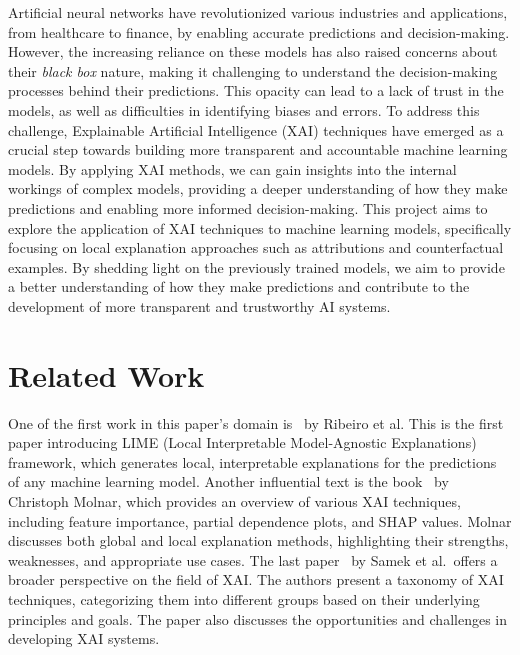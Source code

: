 \documentclass[conference]{IEEEtran}
\begin{document}
    Artificial neural networks have revolutionized various industries and applications, from healthcare to finance, by enabling accurate predictions and decision-making.
    However, the increasing reliance on these models has also raised concerns about their \textit{black box} nature, making it challenging to understand the decision-making processes behind their predictions.
    This opacity can lead to a lack of trust in the models, as well as difficulties in identifying biases and errors.
    To address this challenge, Explainable Artificial Intelligence (XAI) techniques have emerged as a crucial step towards building more transparent and accountable machine learning models.
    By applying XAI methods, we can gain insights into the internal workings of complex models, providing a deeper understanding of how they make predictions and enabling more informed decision-making.
    This project aims to explore the application of XAI techniques to machine learning models, specifically focusing on local explanation approaches such as attributions and counterfactual examples.
    By shedding light on the previously trained models, we aim to provide a better understanding of how they make predictions and contribute to the development of more transparent and trustworthy AI systems.

\section{Related Work}\label{sec:related-work}

    One of the first work in this paper's domain is~\cite{ribeiro2016should} by Ribeiro et al.
    This is the first paper introducing LIME (Local Interpretable Model-Agnostic Explanations) framework, which generates local, interpretable explanations for the predictions of any machine learning model.
    Another influential text is the book~\cite{molnar2019interpretable} by Christoph Molnar, which provides an overview of various XAI techniques, including feature importance, partial dependence plots, and SHAP values.
    Molnar discusses both global and local explanation methods, highlighting their strengths, weaknesses, and appropriate use cases.
    The last paper~\cite{samek2017explainable} by Samek et al.\ offers a broader perspective on the field of XAI\@.
    The authors present a taxonomy of XAI techniques, categorizing them into different groups based on their underlying principles and goals.
    The paper also discusses the opportunities and challenges in developing XAI systems.
\end{document}
